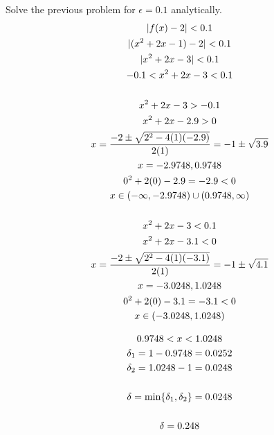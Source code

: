 \documentclass[letterpaper,12pt,fleqn]{article}
\newcommand{\e}{\epsilon}
\renewcommand{\d}{\delta}
\begin{document}
\begin{example}
  Solve the previous problem for \(\e=0.1\) analytically.
  \begin{gather*}
    \lvert f(x)-2\rvert<0.1 \\
    \lvert(x^2+2x-1)-2\rvert<0.1 \\
    \lvert x^2+2x-3\rvert<0.1 \\
    -0.1<x^2+2x-3<0.1 \\
    \\
    x^2+2x-3>-0.1 \\
    x^2+2x-2.9>0 \\
    x=\frac{-2\pm\sqrt{2^2-4(1)(-2.9)}}{2(1)}=-1\pm\sqrt{3.9} \\
    x=-2.9748,0.9748 \\
    0^2+2(0)-2.9=-2.9<0 \\
    x\in(-\infty,-2.9748)\cup(0.9748,\infty) \\
    \\
    x^2+2x-3<0.1 \\
    x^2+2x-3.1<0 \\
    x=\frac{-2\pm\sqrt{2^2-4(1)(-3.1)}}{2(1)}=-1\pm\sqrt{4.1} \\
    x=-3.0248,1.0248 \\
    0^2+2(0)-3.1=-3.1<0 \\
    x\in(-3.0248,1.0248)
  \end{gather*}
  \begin{center}
  \end{center}
  \begin{gather*}
    0.9748<x<1.0248
    \\
    \d_1=1-0.9748=0.0252 \\
    \d_2=1.0248-1=0.0248 \\
    \\
    \d=\min\set{\d_1,\d_2}=0.0248 \\
    \\
    \d=0.248
  \end{gather*}
\end{example}
\end{document}
